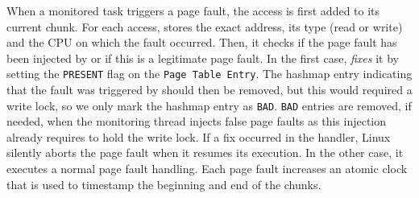 When a monitored task triggers a page fault, the access is first added
to its current chunk. For each access, \Moca stores the exact address, its type (read
or write) and the CPU on which the fault occurred.  Then, it checks if the page
fault has been injected by \Moca or if this is a legitimate page fault.
In the first
case, \Moca \emph{fixes} it by setting the \texttt{PRESENT} flag on the
\texttt{Page Table Entry}.
The hashmap entry indicating that the fault was triggered by \Moca should then
be removed, but this would required a write lock, so we only mark the hashmap
entry as \texttt{BAD}. \texttt{BAD} entries are removed, if needed, when the
monitoring thread injects false page faults as this injection already requires to hold the
write lock.
If a fix occurred in the \Moca handler, Linux silently aborts the page fault
when it resumes its execution. In the other case, it executes a normal page fault handling. Each page
fault increases an atomic clock that is used to timestamp the beginning and end
of the chunks.

